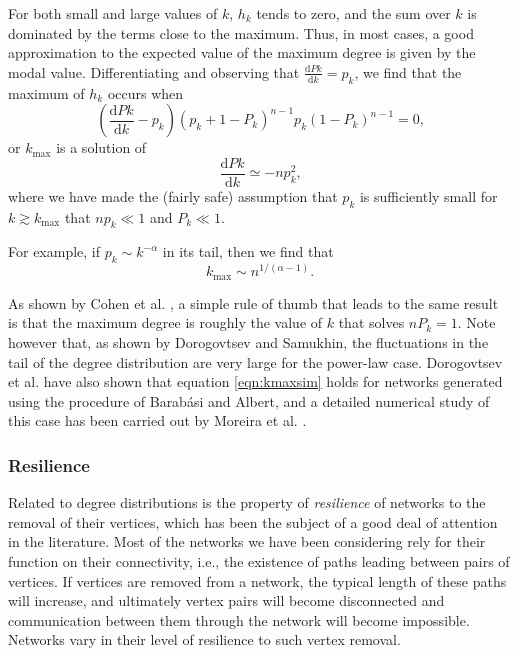         For both small and large values of $k$, $h_k$ tends to zero, and the sum over $k$ is dominated by the terms close to the maximum. Thus, in most cases, a good approximation to the expected value of the maximum degree is given by the modal value. Differentiating and observing that $\frac{\mbox{d}Pk}{\mbox{d}k} = p_k$, we find that the maximum of $h_k$ occurs when
        $$\left(\frac{\mbox{d}Pk}{\mbox{d}k} - p_k\right)(p_k + 1 - P_k)^{n-1} p_k(1 - P_k)^{n-1} = 0\mbox{,}$$
        or $k_{\mbox{max}}$ is a solution of
        $$\frac{\mbox{d}Pk}{\mbox{d}k} \simeq -np^2_k\mbox{,}$$
        where we have made the (fairly safe) assumption that $p_k$ is sufficiently small for $k \gtrsim k_{\mbox{max}}$ that $np_k \ll 1$ and $P_k \ll 1$.
        
        For example, if $p_k \sim k^{−\alpha}$ in its tail, then we find that
        \begin{equation}
          k_{\mbox{max}} \sim n^{1/(\alpha-1)}\mbox{.}
          \label{eqn:kmaxsim}
        \end{equation}
        
        As shown by Cohen et al. \cite{CohenErezAvrahamHavlin2000}, a simple rule of thumb that leads to the same result is that the maximum degree is roughly the value of $k$ that solves $nP_k = 1$. Note however that, as shown by Dorogovtsev and Samukhin\cite{DorogovtsevSamukhin2002}, the fluctuations in the tail of the degree distribution are very large for the power-law case. Dorogovtsev et al. \cite{DorogovtsevMendesSamukhin2001} have also shown that equation \ref{eqn:kmaxsim} holds for networks generated using the  procedure of Barabási and Albert\cite{BarabasiAlbert1999}, and a detailed numerical study of this case has been carried out by Moreira et al. \cite{MoreiraAndradeAmaral2002}.
        
    \subsubsection{Resilience}
    
      Related to degree distributions is the property of \emph{resilience} of networks to the removal of their vertices, which has been the subject of a good deal of attention in the literature. Most of the networks we have been considering rely for their function on their connectivity, i.e., the existence of paths leading between pairs of vertices. If vertices are removed from a network, the typical length of these paths will increase, and ultimately vertex pairs will become disconnected and communication between them through the network will become impossible. Networks vary in their level of resilience to such vertex removal.
      
